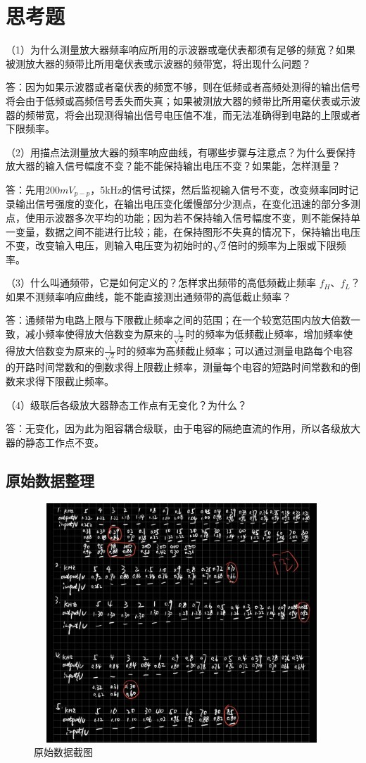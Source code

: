 \documentclass[a4 paper,12pt]{article}
\begin{document}
    \section{思考题}
    \small{（1）为什么测量放大器频率响应所用的示波器或毫伏表都须有足够的频宽？如果被测放大器的频带比所用毫伏表或示波器的频带宽，将出现什么问题？
    \par 答：因为如果示波器或者毫伏表的频宽不够，则在低频或者高频处测得的输出信号将会由于低频或高频信号丢失而失真；如果被测放大器的频带比所用毫伏表或示波器的频带宽，将会出现测得输出信号电压值不准，而无法准确得到电路的上限或者下限频率。
    \par （2）用描点法测量放大器的频率响应曲线，有哪些步骤与注意点？为什么要保持放大器的输入信号幅度不变？能不能保持输出电压不变？如果能，怎样测量？
     \par 答：先用$200mV_{p-p}$，5kHz的信号试探，然后监视输入信号不变，改变频率同时记录输出信号强度的变化，在输出电压变化缓慢部分少测点，在变化迅速的部分多测点，使用示波器多次平均的功能；因为若不保持输入信号幅度不变，则不能保持单一变量，数据之间不能进行比较；能，在保持图形不失真的情况下，保持输出电压不变，改变输入电压，则输入电压变为初始时的$\sqrt{2}$倍时的频率为上限或下限频率。
    \par （3）什么叫通频带，它是如何定义的？怎样求出频带的高低频截止频率 $f_{H}$、$f_{L}$？如果不测频率响应曲线，能不能直接测出通频带的高低截止频率？
     \par 答：通频带为电路上限与下限截止频率之间的范围；在一个较宽范围内放大倍数一致，减小频率使得放大倍数变为原来的$\frac{1}{\sqrt{2}}$时的频率为低频截止频率，增加频率使得放大倍数变为原来的$\frac{1}{\sqrt{2}}$时的频率为高频截止频率；可以通过测量电路每个电容的开路时间常数和的倒数求得上限截止频率，测量每个电容的短路时间常数和的倒数来求得下限截止频率。
    \par （4）级联后各级放大器静态工作点有无变化？为什么？
     \par 答：无变化，因为此为阻容耦合级联，由于电容的隔绝直流的作用，所以各级放大器的静态工作点不变。}
\begin{appendices}
	\section{原始数据整理}
		\begin{figure}[H]
		\centering
		\includegraphics[width=11.1cm,height=9cm]  {放大器.jpg} 
		\caption{\label{1} 原始数据截图}
	\end{figure}
\end{appendices}
\end{document}
